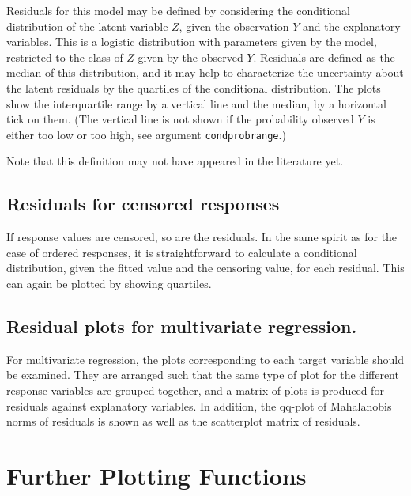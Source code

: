 \documentclass[11pt]{article}
\providecommand{\T}{\texttt}
\providecommand{\Vneed}[1]{\penalty-5000\vskip#1%
\penalty-5000\vspace{-#1}}
\begin{document}
Residuals for this model may be defined by considering the conditional
distribution of the latent variable $Z$, given the observation $Y$ and the
explanatory variables. This is a logistic distribution with parameters
given by the model, restricted to the class of $Z$ given by the observed
$Y$. Residuals are defined as the median of this distribution, and 
it may help to characterize the uncertainty about the latent residuals by 
the quartiles of the conditional distribution.
The plots show the interquartile range by a vertical line and the median,
by a horizontal tick on them. (The vertical line is not shown if the 
probability observed $Y$ is either too low or too high, see argument
\T{condprobrange}.)

Note that this definition may not have appeared in the literature yet.

\subsection{Residuals for censored responses}
If response values are censored, so are the residuals. In the same spirit
as for the case of ordered responses, it is straightforward to calculate 
a conditional distribution, given the fitted value and the censoring value,
for each residual. This can again be plotted by showing quartiles.

\subsection{Residual plots for multivariate regression.}
For multivariate regression, the plots corresponding to each target
variable should be examined. 
They are arranged such that the same type of plot for the different
response variables are grouped together, and a matrix of plots is produced
for residuals against explanatory variables.
In addition, the qq-plot of Mahalanobis norms of residuals is shown as well
as the scatterplot matrix of residuals.

\Vneed{30mm}
\section{Further Plotting Functions}
\end{document}
